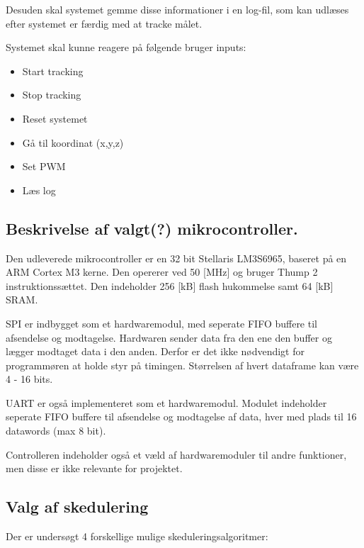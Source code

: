 Desuden skal systemet gemme disse informationer i en log-fil, som kan udlæses efter systemet er færdig med at tracke målet. 

Systemet skal kunne reagere på følgende bruger inputs:


\begin{itemize}
\itemsep1pt
	\item Start tracking
	\item Stop tracking
	\item Reset systemet
	\item Gå til koordinat (x,y,z)
	\item Set PWM
	\item Læs log
\end{itemize}


\subsection{Beskrivelse af valgt(?) mikrocontroller.}
Den udleverede mikrocontroller er en 32 bit Stellaris LM3S6965, baseret på en ARM Cortex M3 kerne. Den opererer ved 50 [MHz] og bruger Thump 2 instruktionssættet. Den indeholder 256 [kB] flash hukommelse samt 64 [kB] SRAM. 
\citep{lm3s6965}

SPI er indbygget som et hardwaremodul, med seperate FIFO buffere til afsendelse og modtagelse. Hardwaren sender data fra den ene den buffer og lægger modtaget data i den anden. Derfor er det ikke nødvendigt for programmøren at holde styr på timingen. Størrelsen af hvert dataframe kan være 4 - 16 bits. 

UART er også implementeret som et hardwaremodul. Modulet indeholder seperate FIFO buffere til afsendelse og modtagelse af data, hver med plads til 16 datawords (max 8 bit). 

Controlleren indeholder også et væld af hardwaremoduler til andre funktioner, men disse er ikke relevante for projektet.


\subsection{Valg af skedulering}
Der er undersøgt 4 forskellige mulige skeduleringsalgoritmer: 

